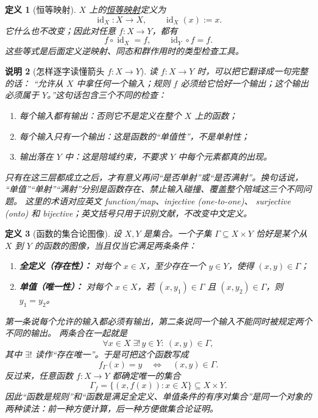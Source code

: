 \documentclass[UTF8,fontset=none,a4paper,11pt]{ctexart}
\theoremstyle{foundation-definition}
\newtheorem{definition}{定义}[section]
\theoremstyle{foundation-theorem}
\theoremstyle{foundation-proposition}
\theoremstyle{foundation-example}
\theoremstyle{foundation-remark}
\newtheorem{remark}[definition]{说明}
\theoremstyle{foundation-theorem}
\newcommand{\term}[2]{\hyperref[#1]{#2}}
\begin{document}
\begin{definition}[恒等映射]\label{def:identity-map}
\(X\) 上的\term{def:identity-map}{恒等映射}定义为
\[
  \operatorname{id}_X:X\longrightarrow X,
  \qquad \operatorname{id}_X(x):=x.
\]
它什么也不改变；因此对任意 \(f:X\to Y\)，都有
\[
  f\circ\operatorname{id}_X=f,
  \qquad \operatorname{id}_Y\circ f=f.
\]
这些等式是后面定义逆映射、同态和群作用时的类型检查工具。
\end{definition}

\begin{remark}[怎样逐字读懂箭头 \(f:X\to Y\)]\label{rem:map-arrow-reading}
读 \(f:X\to Y\) 时，可以把它翻译成一句完整的话：
“允许从 \(X\) 中拿任何一个输入；规则 \(f\) 必须给它恰好一个输出；这个输出必须属于
\(Y\)。”这句话包含三个不同的检查：
\begin{enumerate}[label=(\arabic*)]
  \item 每个输入都有输出：否则它不是定义在整个 \(X\) 上的函数；
  \item 每个输入只有一个输出：这是函数的“单值性”，不是单射性；
  \item 输出落在 \(Y\) 中：这是陪域约束，不要求 \(Y\) 中每个元素都真的出现。
\end{enumerate}
只有在这三层都成立之后，才有意义再问“是否单射”或“是否满射”。换句话说，
“单值”“单射”“满射”分别是函数存在、禁止输入碰撞、覆盖整个陪域这三个不同问题。
这里的术语对应英文 \emph{function/map}、\emph{injective (one-to-one)}、
\emph{surjective (onto)} 和 \emph{bijective}；英文括号只用于识别文献，不改变中文定义。
\end{remark}

\begin{definition}[函数的集合论图像]\label{def:function-graph-formal}
设 \(X,Y\) 是集合。一个子集 \(\Gamma\subseteq X\times Y\) 恰好是某个从 \(X\) 到 \(Y\) 的函数的图像，当且仅当它满足两条条件：
\begin{enumerate}[label=(\alph*)]
  \item \textbf{全定义（存在性）：} 对每个 \(x\in X\)，至少存在一个 \(y\in Y\)，使得 \((x,y)\in\Gamma\)；
  \item \textbf{单值（唯一性）：} 对每个 \(x\in X\)，若 \((x,y_1)\in\Gamma\) 且 \((x,y_2)\in\Gamma\)，则 \(y_1=y_2\)。
\end{enumerate}
第一条说每个允许的输入都必须有输出，第二条说同一个输入不能同时被规定两个不同的输出。
两条合在一起就是
\[
  \forall x\in X\;\exists!\,y\in Y:\ (x,y)\in\Gamma,
\]
其中 \(\exists!\) 读作“存在唯一”。于是可把这个函数写成
\[
  f_\Gamma(x)=y\quad\Longleftrightarrow\quad (x,y)\in\Gamma.
\]
反过来，任意函数 \(f:X\to Y\) 都确定唯一的集合
\[
  \Gamma_f=\{(x,f(x)):x\in X\}\subseteq X\times Y.
\]
因此“函数是规则”和“函数是满足全定义、单值条件的有序对集合”是同一个对象的两种读法：前一种方便计算，后一种方便做集合论证明。
\end{definition}
\end{document}
